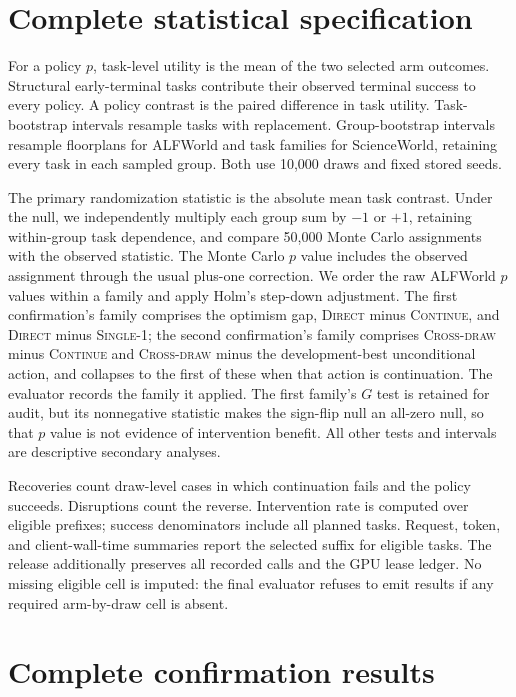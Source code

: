 \section{Complete statistical specification}
\label{app:statistics}

For a policy $p$, task-level utility is the mean of the two selected arm outcomes. Structural early-terminal tasks contribute their observed terminal success to every policy. A policy contrast is the paired difference in task utility. Task-bootstrap intervals resample tasks with replacement. Group-bootstrap intervals resample floorplans for ALFWorld and task families for ScienceWorld, retaining every task in each sampled group. Both use 10,000 draws and fixed stored seeds.

The primary randomization statistic is the absolute mean task contrast. Under the null, we independently multiply each group sum by $-1$ or $+1$, retaining within-group task dependence, and compare 50,000 Monte Carlo assignments with the observed statistic. The Monte Carlo $p$ value includes the observed assignment through the usual plus-one correction. We order the raw ALFWorld $p$ values within a family and apply Holm's step-down adjustment. The first confirmation's family comprises the optimism gap, \textsc{Direct} minus \textsc{Continue}, and \textsc{Direct} minus \textsc{Single-1}; the second confirmation's family comprises \textsc{Cross-draw} minus \textsc{Continue} and \textsc{Cross-draw} minus the development-best unconditional action, and collapses to the first of these when that action is continuation. The evaluator records the family it applied. The first family's $G$ test is retained for audit, but its nonnegative statistic makes the sign-flip null an all-zero null, so that $p$ value is not evidence of intervention benefit. All other tests and intervals are descriptive secondary analyses.

Recoveries count draw-level cases in which continuation fails and the policy succeeds. Disruptions count the reverse. Intervention rate is computed over eligible prefixes; success denominators include all planned tasks. Request, token, and client-wall-time summaries report the selected suffix for eligible tasks. The release additionally preserves all recorded calls and the GPU lease ledger. No missing eligible cell is imputed: the final evaluator refuses to emit results if any required arm-by-draw cell is absent.

\section{Complete confirmation results}
\label{app:results}

